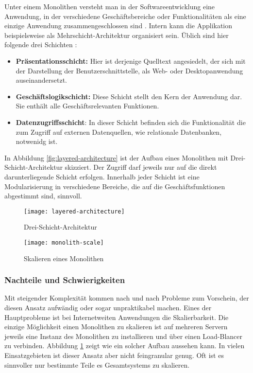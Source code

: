 Unter einem Monolithen versteht man in der Softwareentwicklung eine Anwendung, in der verschiedene Geschäftsbereiche oder Funktionalitäten als eine einzige Anwendung zusammengeschlossen sind \cite{FowlerMS}. Intern kann die Applikation beispielsweise als Mehrschicht-Architektur organisiert sein. Üblich sind hier folgende drei Schichten \cite{FowlerPEA}:

\begin{itemize}
	\item \textbf{Präsentationsschicht:} Hier ist derjenige Quelltext angesiedelt, der sich mit der Darstellung der Benutzerschnittstelle, \zB als Web- oder Desktopanwendung auseinandersetzt.
	\item \textbf{Geschäftslogikschicht:} Diese Schicht stellt den Kern der Anwendung dar. Sie enthält alle Geschäftsrelevanten Funktionen.
	\item \textbf{Datenzugriffsschicht}: In dieser Schicht befinden sich die Funktionalität die zum Zugriff auf externen Datenquellen, wie \zB relationale Datenbanken, notwenidg ist.
\end{itemize}


In Abbildung \ref{fig:layered-architecture} ist der Aufbau eines Monolithen mit Drei-Schicht-Architektur skizziert. Der Zugriff darf jeweils nur auf die direkt darunterliegende Schicht erfolgen. Innerhalb jeder Schicht ist eine Modularisierung in verschiedene Bereiche, die auf die Geschäftsfunktionen abgestimmt sind, sinnvoll.

\begin{figure}[!htb]
\centering
{}
  \centering
	\texttt{[image: layered-architecture]}
	\caption{Drei-Schicht-Architektur}
	\label{fig:layered-architecture}
\endminipage
{}
  \centering
	\texttt{[image: monolith-scale]}
	\caption{Skalieren eines Monolithen}
	\label{fig:monolith-scale}
\endminipage
\end{figure}

\subsubsection{Nachteile und Schwierigkeiten}

Mit steigender Komplexität kommen nach und nach Probleme zum Vorschein, der diesen Ansatz aufwändig oder sogar unpraktikabel machen. Eines der Hauptprobleme ist bei Internetweiten Anwendungen die Skalierbarkeit. Die einzige Möglichkeit einen Monolithen zu skalieren ist auf mehreren Servern jeweils eine Instanz des Monolithen zu installieren und über einen Load-Blancer zu verbinden. Abbildung \ref{fig:monolith-scale} zeigt wie ein solcher Aufbau aussehen kann. In vielen Einsatzgebieten ist dieser Ansatz aber nicht feingranular genug. Oft ist es sinnvoller nur bestimmte Teile es Gesamtsystems zu skalieren.

